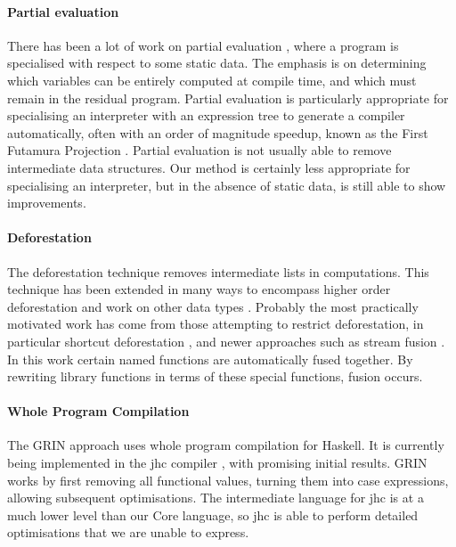 \paragraph{Partial evaluation} There has been a lot of work on partial evaluation \cite{jones:partial_evaluation}, where a program is specialised with respect to some static data. The emphasis is on determining which variables can be entirely computed at compile time, and which must remain in the residual program. Partial evaluation is particularly appropriate for specialising an interpreter with an expression tree to generate a compiler automatically, often with an order of magnitude speedup, known as the First Futamura Projection \cite{futanama:projections}. Partial evaluation is not usually able to remove intermediate data structures. Our method is certainly less appropriate for specialising an interpreter, but in the absence of static data, is still able to show improvements.


\paragraph{Deforestation} The deforestation technique \cite{wadler:deforestation} removes intermediate lists in computations. This technique has been extended in many ways to encompass higher order deforestation \cite{marlow:higher_order_deforestation} and work on other data types \cite{coutts:string_fusion}. Probably the most practically motivated work has come from those attempting to restrict deforestation, in particular shortcut deforestation \cite{gill:shortcut_deforestation}, and newer approaches such as stream fusion \cite{coutts:stream_fusion}. In this work certain named functions are automatically fused together. By rewriting library functions in terms of these special functions, fusion occurs.

\paragraph{Whole Program Compilation} The GRIN approach \cite{grin} uses whole program compilation for Haskell. It is currently being implemented in the jhc compiler \cite{jhc}, with promising initial results. GRIN works by first removing all functional values, turning them into case expressions, allowing subsequent optimisations. The intermediate language for jhc is at a much lower level than our Core language, so jhc is able to perform detailed optimisations that we are unable to express.

